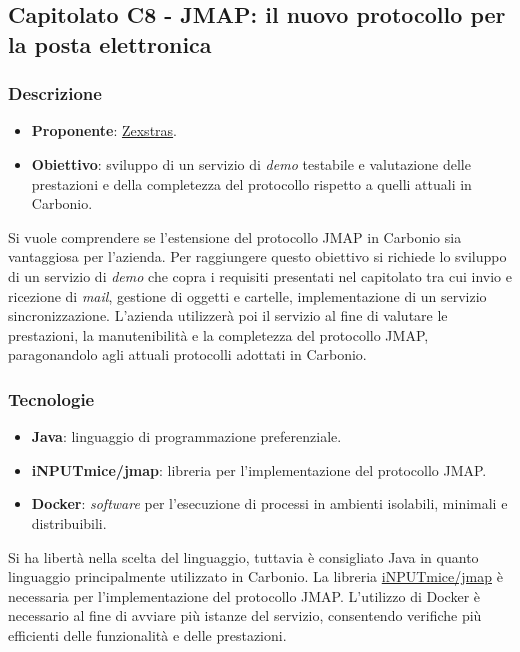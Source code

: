 \subsection{Capitolato C8 - JMAP: il nuovo protocollo per la posta elettronica}


\subsubsection{Descrizione}
\begin{itemize}
    \item \textbf{Proponente}: \href{https://zextras.com/it}{Zexstras}.
    \item \textbf{Obiettivo}: sviluppo di un servizio di \textit{demo} testabile e valutazione delle prestazioni e della completezza del protocollo rispetto a quelli attuali in Carbonio.
\end{itemize}
Si vuole comprendere se l'estensione del protocollo JMAP in Carbonio sia vantaggiosa per l'azienda.
Per raggiungere questo obiettivo si richiede lo sviluppo di un servizio di \textit{demo} che copra i requisiti presentati nel capitolato tra cui invio e ricezione di \textit{mail}, gestione di oggetti e cartelle, implementazione di un servizio sincronizzazione.
L'azienda utilizzerà poi il servizio al fine di valutare le prestazioni, la manutenibilità e la completezza del protocollo JMAP, paragonandolo agli attuali protocolli adottati in Carbonio.

\subsubsection{Tecnologie}
\begin{itemize}
    \item \textbf{Java}: linguaggio di programmazione preferenziale.
    \item \textbf{iNPUTmice/jmap}: libreria per l'implementazione del protocollo JMAP.
    \item \textbf{Docker}: \textit{software} per l'esecuzione di processi in ambienti isolabili, minimali e distribuibili.
\end{itemize}
Si ha libertà nella scelta del linguaggio, tuttavia è consigliato Java in quanto linguaggio principalmente utilizzato in Carbonio.
La libreria \href{https://github.com/iNPUTmice/jmap}{iNPUTmice/jmap} è necessaria per l'implementazione del protocollo JMAP.
L'utilizzo di Docker è necessario al fine di avviare più istanze del servizio, consentendo verifiche più efficienti delle funzionalità e delle prestazioni.

